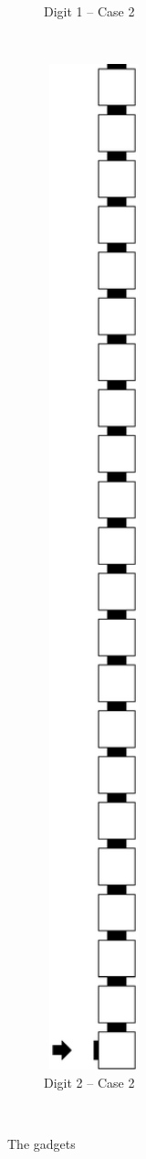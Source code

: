 \begin{itemize}
\begin{figure}[H]
\begin{subfigure}[t]{0.32\textwidth}
                \caption{\label{fig:post_warp_case2_digit1_msr} Digit 1 -- Case 2}
            \end{subfigure}%
            ~
            \begin{subfigure}[t]{0.32\textwidth}
                \centering
                \includegraphics[width=0.32\textwidth]{warping_post_warp_case2_digit2_msr}
                \caption{\label{fig:post_warp_case2_digit2_msr} Digit 2 -- Case 2}
            \end{subfigure}%
            ~
            \caption{\label{fig:post_warp_gadgets} The {\postwarp} gadgets }
        \end{figure}

    \end{itemize}

